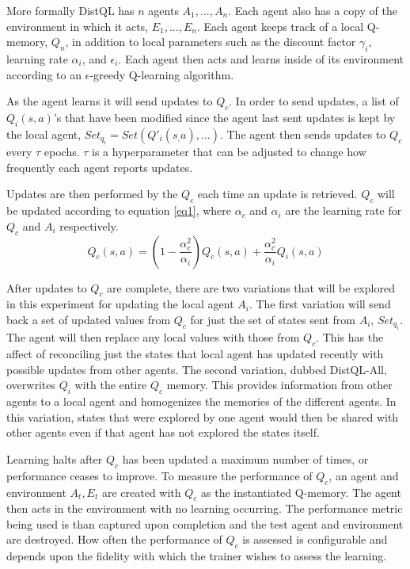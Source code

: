 \documentclass[jair,twoside,11pt,theapa]{article}
\begin{document}
More formally DistQL has $n$ agents $A_1, ... , A_n$. Each agent also has a copy of the environment in which it acts, $E_1, ..., E_n$. Each agent keeps track 
of a local Q-memory, $Q_n$, in addition to local parameters such as the discount factor $\gamma_i$, learning rate $\alpha_i$, and $\epsilon_i$. Each agent then acts and learns inside of
its environment according to an $\epsilon$-greedy Q-learning algorithm. 

As the agent learns it will send updates to $Q_c$. In order to send updates, a list of $Q_i(s,a)$'s that have been modified since the agent last sent updates is kept by the local agent,
$Set_{q_i} = Set(Q'_i(s_,a), ... )$.
The agent then sends updates to $Q_c$ every $\tau$ epochs. $\tau$ is a hyperparameter that can be adjusted to change how frequently each agent reports updates. 

Updates are then performed by the $Q_c$ each time an update is retrieved. $Q_c$ will be updated according to equation \ref{eq1},
where $\alpha_{c}$ and $\alpha_i$ are the learning rate for $Q_c$ and $A_i$ respectively. 
\begin{equation}
\label{eq1}
Q_c(s,a) = (1-\frac{\alpha_{c}^{2}}{\alpha_i})Q_c(s,a) + \frac{\alpha_{c}^{2}}{\alpha_i} Q_i(s,a)
\end{equation}

After updates to $Q_c$ are complete, there are two variations that will be explored in this experiment for updating the local agent $A_i$. 
The first variation will send back a set of updated values from $Q_c$ for just the set of states sent from $A_i$, $Set_{q_i}$. The agent will 
then replace any local values with those from $Q_c$. This has the affect of reconciling just the states that local agent has updated recently 
with possible updates from other agents. 
The second variation, dubbed DistQL-All, overwrites $Q_i$ with the entire $Q_c$ memory. This provides information from other agents to a local agent and homogenizes 
the memories of the different agents. In this variation, states that were explored by one agent would then be shared with other agents even if that 
agent has not explored the states itself. 

Learning halts after $Q_c$ has been updated a maximum number of times, or performance ceases to improve. To measure the performance of $Q_c$, an agent 
and environment $A_t, E_t$ are created with $Q_c$ as the instantiated Q-memory. The agent then acts in the environment with no learning occurring. 
The performance metric being used is than captured upon completion and the test agent and environment are destroyed. How often the performance of $Q_c$ 
is assessed is configurable and depends upon the fidelity with which the trainer wishes to assess the learning. 
\end{document}
